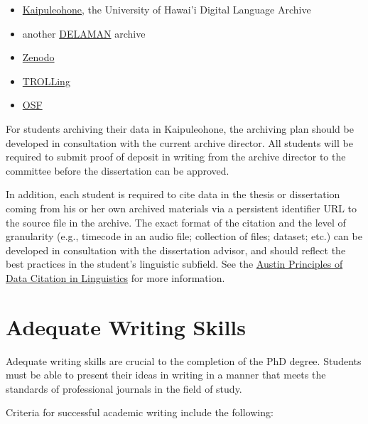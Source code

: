 \documentclass[
]{book}
\providecommand{\tightlist}{%
  \setlength{\itemsep}{0pt}\setlength{\parskip}{0pt}}
\begin{document}
\begin{itemize}
\tightlist
\item
  \href{https://hdl.handle.net/10125/4250}{Kaipuleohone}, the University of Hawai'i Digital Language Archive
\item
  another \href{http://www.delaman.org}{DELAMAN} archive
\item
  \href{http://zenodo.org}{Zenodo}
\item
  \href{https://trolling.uit.no/}{TROLLing}
\item
  \href{http:/osf.io}{OSF}
\end{itemize}

For students archiving their data in Kaipuleohone, the archiving plan should be developed in consultation with the current archive director. All students will be required to submit proof of deposit in writing from the archive director to the committee before the dissertation can be approved.

In addition, each student is required to cite data in the thesis or dissertation coming from his or her own archived materials via a persistent identifier URL to the source file in the archive. The exact format of the citation and the level of granularity (e.g., timecode in an audio file; collection of files; dataset; etc.) can be developed in consultation with the dissertation advisor, and should reflect the best practices in the student's linguistic subfield. See the \href{https://site.uit.no/linguisticsdatacitation/}{Austin Principles of Data Citation in Linguistics} for more information.

\section{Adequate Writing Skills}\label{writing}

Adequate writing skills are crucial to the completion of the PhD degree. Students must be able to present their ideas in writing in a manner that meets the standards of professional journals in the field of study.

Criteria for successful academic writing include the following:
\end{document}
